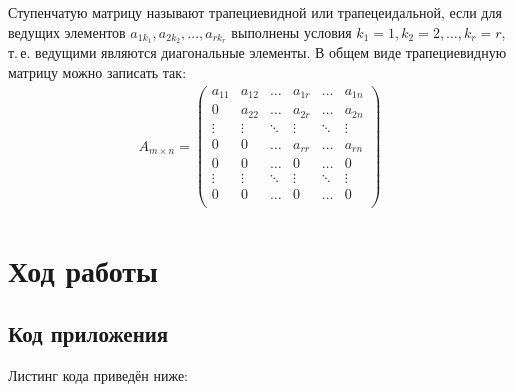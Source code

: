 \documentclass[a4paper,12pt]{article}
\begin{document}
Ступенчатую матрицу называют трапециевидной или трапецеидальной, если для ведущих элементов \(a_{1k_1}, a_{2k_2}, \dots, a_{r k_r}\) выполнены условия \(k_1=1, k_2=2,\dots,k_r=r\), т.\,е. ведущими являются диагональные элементы. В общем виде трапециевидную матрицу можно записать так:
\[
\begin{align*}
A_{m \times n} = \left(
\begin{array}{cccccc}
a_{11} & a_{12} & \dots & a_{1r} & \dots & a_{1n} \\
0      & a_{22} & \dots & a_{2r} & \dots & a_{2n} \\
\vdots & \vdots & \ddots & \vdots & \ddots & \vdots \\
0      & 0      & \dots & a_{rr} & \dots & a_{rn} \\
0      & 0      & \dots & 0      & \dots & 0      \\
\vdots & \vdots & \ddots & \vdots & \ddots & \vdots \\
0      & 0      & \dots & 0      & \dots & 0      \\
\end{array}
\right)
\end{align*}
\]

\section{Ход работы}
\label{sec:exp}

\subsection{Код приложения}
\label{sec:exp:code}
Листинг кода приведён ниже:
\end{document}
